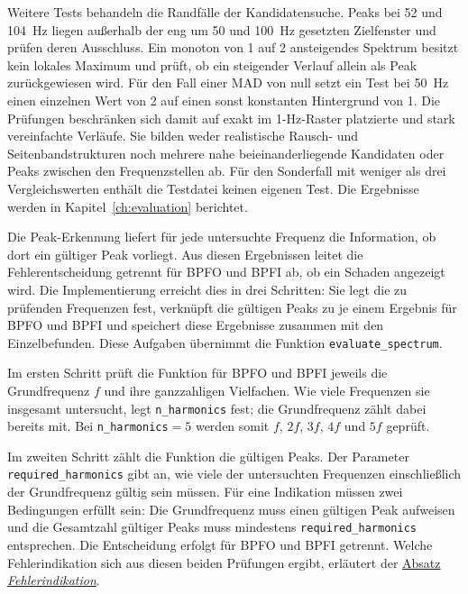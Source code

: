 Weitere Tests behandeln die Randfälle der Kandidatensuche. Peaks bei 52 und
104~Hz liegen außerhalb der eng um 50 und 100~Hz gesetzten Zielfenster und
prüfen deren Ausschluss. Ein monoton von 1 auf 2 ansteigendes Spektrum besitzt
kein lokales Maximum und prüft, ob ein steigender Verlauf allein als Peak
zurückgewiesen wird. Für den Fall einer MAD von null setzt ein Test bei 50~Hz
einen einzelnen Wert von 2 auf einen sonst konstanten Hintergrund von 1. Die
Prüfungen beschränken sich damit auf exakt im 1-Hz-Raster platzierte und stark
vereinfachte Verläufe. Sie bilden weder realistische Rausch- und
Seitenbandstrukturen noch mehrere nahe beieinanderliegende Kandidaten oder
Peaks zwischen den Frequenzstellen ab. Für den Sonderfall mit weniger als drei
Vergleichswerten enthält die Testdatei keinen eigenen Test. Die Ergebnisse
werden in Kapitel~\ref{ch:evaluation} berichtet.

\label{subsec:fehlerentscheidung_impl}

Die Peak-Erkennung liefert für jede untersuchte Frequenz die Information, ob
dort ein gültiger Peak vorliegt. Aus diesen Ergebnissen leitet die
Fehlerentscheidung getrennt für BPFO und BPFI ab, ob ein Schaden angezeigt
wird. Die Implementierung erreicht dies in drei Schritten:
Sie legt die zu prüfenden Frequenzen fest, verknüpft die gültigen Peaks zu je
einem Ergebnis für BPFO und BPFI und speichert diese Ergebnisse zusammen mit
den Einzelbefunden. Diese Aufgaben übernimmt die Funktion
\texttt{evaluate\_spectrum}.

Im ersten Schritt prüft die Funktion für BPFO und BPFI jeweils die
Grundfrequenz $f$ und ihre ganzzahligen Vielfachen. Wie viele Frequenzen sie
insgesamt untersucht, legt \texttt{n\_harmonics} fest; die Grundfrequenz zählt
dabei bereits mit. Bei \texttt{n\_harmonics}$=5$ werden somit $f$, $2f$, $3f$,
$4f$ und $5f$ geprüft.

Im zweiten Schritt zählt die Funktion die gültigen Peaks. Der Parameter
\texttt{required\_\allowbreak harmonics} gibt an, wie viele der untersuchten Frequenzen
einschließlich der Grundfrequenz gültig sein müssen. Für eine Indikation müssen
zwei Bedingungen erfüllt sein: Die Grundfrequenz muss einen gültigen Peak
aufweisen und die Gesamtzahl gültiger Peaks muss mindestens
\texttt{required\_\allowbreak harmonics} entsprechen. Die Entscheidung erfolgt für BPFO
und BPFI getrennt. Welche Fehlerindikation sich aus diesen beiden Prüfungen
ergibt, erläutert der
\hyperref[par:fehlerindikation_pipeline]{Absatz \emph{Fehlerindikation}}.

